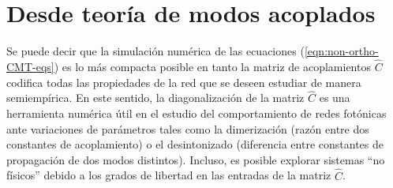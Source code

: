 \section{Desde teoría de modos acoplados}
Se puede decir que la simulación numérica de las ecuaciones (\ref{eqn:non-ortho-CMT-eqs}) es lo más compacta posible en tanto la matriz de acoplamientos $\hat{C}$ codifica todas las propiedades de la red que se deseen estudiar de manera semiempírica. En este sentido, la diagonalización de la matriz $\hat{C}$ es una herramienta numérica útil en el estudio del comportamiento de redes fotónicas ante variaciones de parámetros tales como la dimerización (razón entre dos constantes de acoplamiento) o el desintonizado (diferencia entre constantes de propagación de dos modos distintos). Incluso, es posible explorar sistemas ``no físicos'' debido a los grados de libertad en las entradas de la matriz $\hat{C}$.